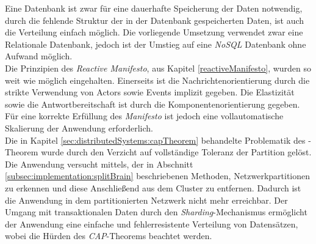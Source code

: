 Eine Datenbank ist zwar für eine dauerhafte Speicherung der Daten notwendig, durch die fehlende Struktur der in der Datenbank gespeicherten Daten, ist auch die Verteilung einfach möglich. Die vorliegende Umsetzung verwendet zwar eine Relationale Datenbank, jedoch ist der Umstieg auf eine \textit{NoSQL} Datenbank ohne Aufwand möglich. \\
Die Prinzipien des \textit{Reactive Manifesto}, aus Kapitel \ref{reactiveManifesto}, wurden so weit wie möglich eingehalten. Einerseits ist die Nachrichtenorientierung durch die strikte Verwendung von Actors sowie Events implizit gegeben. Die Elastizität sowie die Antwortbereitschaft ist durch die Komponentenorientierung gegeben. Für eine korrekte Erfüllung des \textit{Manifesto} ist jedoch eine vollautomatische Skalierung der Anwendung erforderlich. \\
Die in Kapitel \ref{sec:distributedSystems:capTheorem} behandelte Problematik des -Theorem wurde durch den Verzicht auf vollständige Toleranz der Partition gelöst. Die Anwendung versucht mittels, der in Abschnitt 
\ref{subsec:implementation:splitBrain} beschriebenen Methoden, Netzwerkpartitionen zu erkennen und diese Anschließend aus dem Cluster zu entfernen. Dadurch ist die Anwendung in dem partitionierten Netzwerk nicht mehr erreichbar. Der Umgang mit transaktionalen Daten durch den \textit{Sharding}-Mechanismus ermöglicht der Anwendung eine einfache und fehlerresistente Verteilung von Datensätzen, wobei die Hürden des \textit{CAP}-Theorems beachtet werden.


